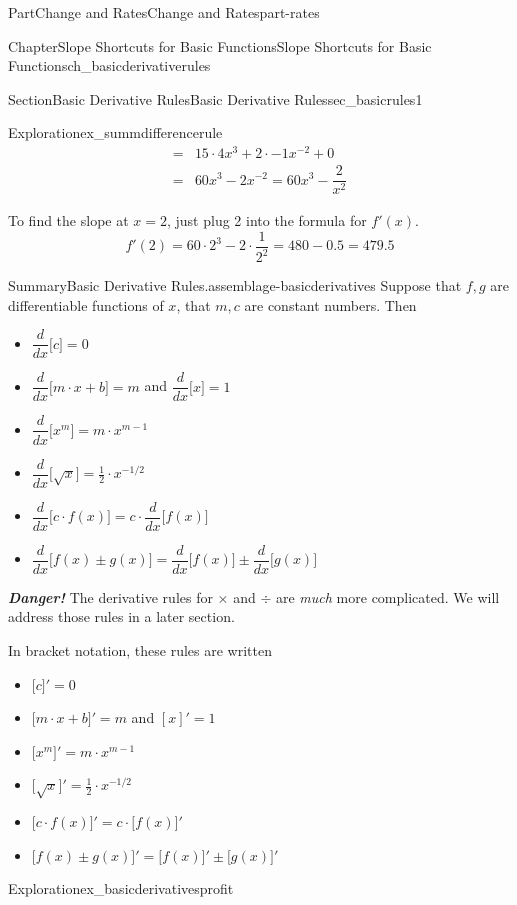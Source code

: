 \documentclass{tufte-book}
\newcommand{\alert}[1]{\textbf{\textit{#1}}}
\numberwithin{equation}{chapter}
\newcommand{\ddx}[1]{ \dfrac{d}{dx} \Big[ #1 \Big]  }
\newcommand{\D}[1]{ \Big[ #1 \Big]'  }
\newcommand{\amp}{&}
\begin{document}
\begin{partptx}{Part}{Change and Rates}{}{Change and Rates}{}{}{part-rates}
\begin{chapterptx}{Chapter}{Slope Shortcuts for Basic Functions}{}{Slope Shortcuts for Basic Functions}{}{}{ch_basicderivativerules}
\begin{sectionptx}{Section}{Basic Derivative Rules}{}{Basic Derivative Rules}{}{}{sec_basicrules1}
\begin{exploration}{Exploration}{}{ex_summdifferencerule}
\begin{align*}
= \amp 15\cdot 4x^3 + 2\cdot -1 x^{-2} + 0\\
= \amp 60x^3 - 2 x^{-2} = 60 x^3 - \dfrac{2}{x^2}
\end{align*}
%
\par
To find the slope at \(x=2\), just plug 2 into the formula for \(f'(x)\).%
\begin{equation*}
f'(2) = 60 \cdot 2^3 - 2\cdot \frac{1}{2^2} = 480 - 0.5 = 479.5
\end{equation*}
%
\end{exploration}%
\begin{assemblage}{Summary}{Basic Derivative Rules.}{assemblage-basicderivatives}%
Suppose that \(f,g\) are differentiable functions of \(x\), that \(m,c\) are constant numbers.  Then%
\begin{itemize}[label=\textbullet]
\item{}\(\displaystyle \ddx{c}=0\)%
\item{}\(\ddx{m\cdot x+b}=m\) and \(\ddx{x} = 1\)%
\item{}\(\displaystyle \ddx{x^m}=m\cdot x^{m-1}\)%
\item{}\(\displaystyle \ddx{ \sqrt{x}}=\frac{1}{2}\cdot x^{-1/2}\)%
\item{}\(\displaystyle \ddx{ c\cdot f(x)}=c\cdot \ddx{f(x)}\)%
\item{}\(\displaystyle \ddx{f(x) \pm g(x)} = \ddx{f(x)} \pm \ddx{g(x)}\)%
\end{itemize}
%
\par
\alert{Danger!} The derivative rules for \(\times\) and \(\div\) are \emph{much} more complicated.  We will address those rules in a later section.%
\par
In bracket notation, these rules are written%
\begin{itemize}[label=\textbullet]
\item{}\(\displaystyle \D{c}=0\)%
\item{}\(\D{m\cdot x+b} =m\) and \([x]' = 1 \)%
\item{}\(\displaystyle \D{x^m} =m\cdot x^{m-1}\)%
\item{}\(\displaystyle \D{\sqrt{x}}=\frac{1}{2}\cdot x^{-1/2}\)%
\item{}\(\displaystyle \D{ c\cdot f(x)} =c\cdot \D{f(x)}\)%
\item{}\(\displaystyle \D{f(x) \pm g(x)}  = \D{f(x)} \pm \D{g(x)}\)%
\end{itemize}
%
\end{assemblage}
\begin{exploration}{Exploration}{}{ex_basicderivativesprofit}%

\end{exploration}
\end{sectionptx}
\end{chapterptx}
\end{partptx}
\end{document}
